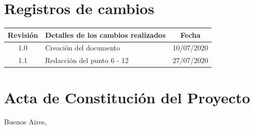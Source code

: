 \documentclass[11pt]{charter}
\begin{document}
\maketitle
\thispagestyle{empty}
\pagebreak


\thispagestyle{empty}
{\setlength{\parskip}{0pt}
\tableofcontents{}
}
\pagebreak


\section{Registros de cambios}
\label{sec:registro}


\begin{table}[ht]
\label{tab:registro}
\centering

\begin{tabularx}{\linewidth}{@{}|c|X|c|@{}}
\hline
\rowcolor[HTML]{C0C0C0} 
Revisión & \multicolumn{1}{c|}{\cellcolor[HTML]{C0C0C0}Detalles de los cambios realizados} & Fecha      \\ \hline
1.0      & Creación del documento                                                          & 10/07/2020 \\ \hline
1.1      & Redacción del punto 6 - 12                                                      & 27/07/2020 \\ \hline
\end{tabularx}
\end{table}

\pagebreak



\section{Acta de Constitución del Proyecto}
\label{sec:acta}

\begin{flushright}
Buenos Aires, \fechaInicioName
\end{flushright}
\end{document}

